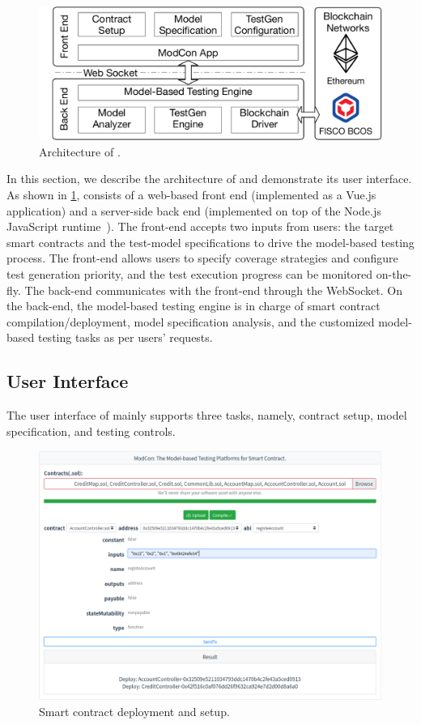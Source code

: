 \begin{figure}[t]
	\centering
	\includegraphics[width=.9\columnwidth]{Figures/Chapter3/modcon-arch.pdf}
	\caption{Architecture of \modcon.}
	\label{fig:architecture}
\end{figure}

In this section, we describe the architecture of \modcon and demonstrate its user interface.
As shown in \cref{fig:architecture}, \modcon consists of a web-based front end (implemented as a
Vue.js~\cite{vuejs} application) and a server-side back end (implemented on top of the Node.js
JavaScript runtime~\cite{nodejs}).
The front-end accepts two inputs from users: the target smart contracts
and the test-model specifications to drive the model-based testing process.
The front-end allows users to specify coverage strategies and configure test generation priority,
and the test execution progress can be monitored on-the-fly.
The back-end communicates with the front-end through the WebSocket.
On the back-end, the model-based testing engine is in charge of smart contract
compilation/deployment, model specification analysis, and the customized model-based testing tasks
as per users' requests.

\subsection{User Interface}
The user interface of \modcon mainly supports three tasks, namely, contract setup, model
specification, and testing controls.

\begin{figure}[t]
	\centering
	\includegraphics[width=0.90\columnwidth]{Figures/Chapter3/modcon-home.png}
	\caption{Smart contract deployment and setup.}
	\label{fig:modcon-home}
\end{figure}

